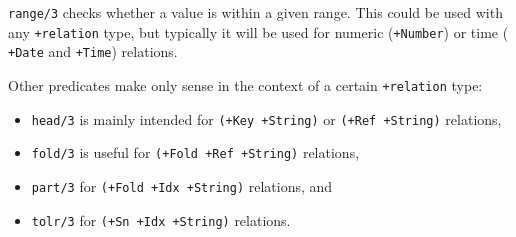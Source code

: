 \texttt{range/3} checks whether a value is within a given range. This could be
used with any \texttt{+relation} type, but typically it will be used for
numeric (\texttt{+Number}) or time ( \texttt{+Date} and \texttt{+Time}) relations.

Other predicates make only sense in the context of a certain \texttt{+relation}
type:

\begin{itemize}
\item \texttt{head/3} is mainly intended for \texttt{(+Key +String)} or \texttt{(+Ref +String)}
   relations,
\item \texttt{fold/3} is useful for \texttt{(+Fold +Ref +String)} relations,
\item \texttt{part/3} for \texttt{(+Fold +Idx +String)} relations, and
\item \texttt{tolr/3} for \texttt{(+Sn +Idx +String)} relations.
\end{itemize}


